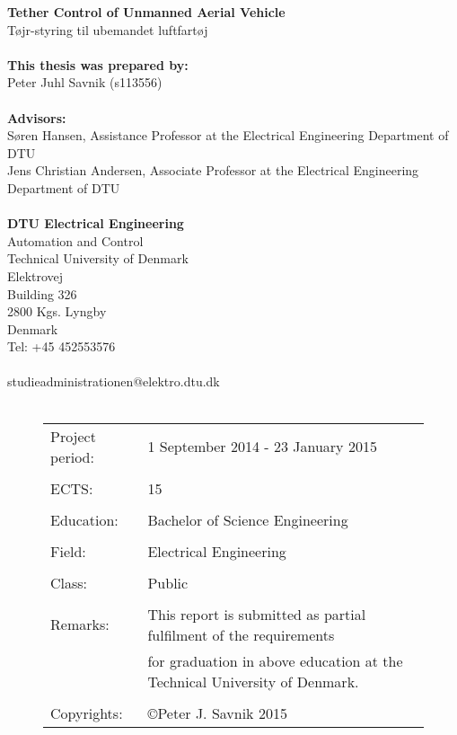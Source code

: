 \noindent
\textbf{Tether Control of Unmanned Aerial Vehicle}\\
Tøjr-styring til ubemandet luftfartøj\\
\\
\textbf{This thesis was prepared by:}\\
Peter Juhl Savnik (s113556)\\
\\
\textbf{Advisors:}\\
Søren Hansen, Assistance Professor at the Electrical Engineering Department of DTU\\
Jens Christian Andersen, Associate Professor at the Electrical Engineering Department of DTU\\
\\
\textbf{DTU Electrical Engineering} \\
Automation and Control\\
Technical University of Denmark\\
Elektrovej\\
Building 326\\
2800 Kgs. Lyngby\\
Denmark\\
Tel: +45 452553576\\
\\
studieadministrationen@elektro.dtu.dk\\
\\
\begin{figure}[b]
\begin{tabular}{ll}
Project period: & 1 September 2014 - 23 January 2015\\
 & \\
ECTS: & 15\\
 & \\
Education: & Bachelor of Science Engineering\\
 & \\
Field: & Electrical Engineering\\
 & \\
Class: & Public\\
 & \\
Remarks: & This report is submitted as partial fulfilment of the requirements\\
 & for graduation in above education at the Technical University of Denmark.\\
 & \\
Copyrights: & \copyright Peter J. Savnik 2015
\end{tabular}
\end{figure}

